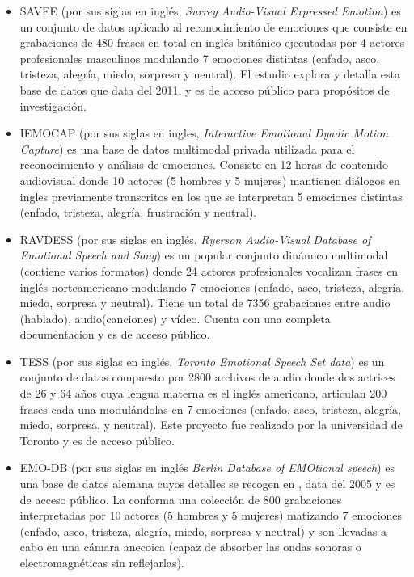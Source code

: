 \documentclass[11pt,a4paper,spanish]{book}
\begin{document}
	\begin{itemize}
		\item SAVEE (por sus siglas en inglés, \emph{ Surrey Audio-Visual Expressed Emotion}) es un conjunto de datos aplicado al reconocimiento de emociones que consiste en grabaciones de 480 frases en total en inglés británico ejecutadas por 4 actores profesionales masculinos modulando 7 emociones distintas (enfado, asco, tristeza, alegría, miedo, sorpresa y neutral). El estudio \cite{SAVEEdataset} explora y detalla esta base de datos que data del 2011, y es de acceso público para propósitos de investigación.
		
		\item IEMOCAP (por sus siglas en ingles, \emph{Interactive Emotional Dyadic Motion Capture}) es una base de datos multimodal privada utilizada para el reconocimiento y análisis de emociones. Consiste en 12 horas de contenido audiovisual donde 10 actores (5 hombres y 5 mujeres) mantienen diálogos en ingles previamente transcritos en los que se interpretan 5 emociones distintas (enfado, tristeza, alegría, frustración y neutral).
		
		\item RAVDESS (por sus siglas en inglés, \emph{Ryerson Audio-Visual Database of Emotional Speech and Song}) es un popular conjunto dinámico multimodal (contiene varios formatos) donde 24 actores profesionales vocalizan frases en inglés norteamericano modulando 7 emociones (enfado, asco, tristeza, alegría, miedo, sorpresa y neutral). Tiene un total de 7356 grabaciones entre audio (hablado), audio(canciones) y vídeo. Cuenta con una completa documentacion \cite{Livingstone2018} y es de acceso público.
		
		\item TESS (por sus siglas en inglés, \emph{Toronto Emotional Speech Set data}) es un conjunto de datos compuesto por 2800 archivos de audio donde dos actrices de 26 y 64 años cuya lengua materna es el inglés americano, articulan 200 frases cada una modulándolas en 7 emociones (enfado, asco, tristeza, alegría, miedo, sorpresa, y neutral). Este proyecto fue realizado por la universidad de Toronto \cite{SP2/E8H2MF_2020} y es de acceso público.
		
		\item EMO-DB (por sus siglas en inglés \emph{Berlin Database of EMOtional speech}) es una base de datos alemana cuyos detalles se recogen en \cite{emodb2005}, data del 2005 y es de acceso público. La conforma una colección de 800 grabaciones interpretadas por 10 actores (5 hombres y 5 mujeres) matizando 7 emociones (enfado, asco, tristeza, alegría, miedo, sorpresa y neutral) y son llevadas a cabo en una cámara anecoica (capaz de absorber las ondas sonoras o electromagnéticas sin reflejarlas).
		
	\end{itemize}
\end{document}
